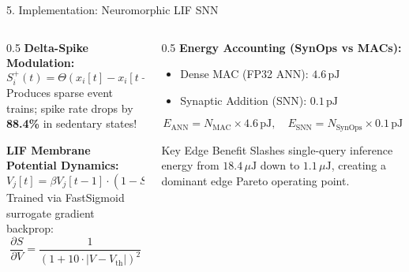 \documentclass[aspectratio=169]{beamer}
\begin{document}
\begin{frame}{5. Implementation: Neuromorphic LIF SNN}
\begin{columns}
\begin{column}{0.5\textwidth}
\textbf{Delta-Spike Modulation:}
\begin{equation*}
S_i^+(t) = \Theta(x_i[t] - x_i[t-1] - \delta)
\end{equation*}
Produces sparse event trains; spike rate drops by \textbf{88.4\%} in sedentary states!

\vspace{0.5em}
\textbf{LIF Membrane Potential Dynamics:}
\begin{equation*}
V_j[t] = \beta V_j[t-1] \cdot (1 - S_j^{\text{out}}[t-1]) + \sum W_{ij} S_i[t]
\end{equation*}
Trained via FastSigmoid surrogate gradient backprop:
\begin{equation*}
\frac{\partial S}{\partial V} = \frac{1}{(1 + 10 \cdot |V - V_{\text{th}}|)^2}
\end{equation*}
\end{column}
\begin{column}{0.5\textwidth}
\textbf{Energy Accounting (SynOps vs MACs):}
\begin{itemize}
    \item Dense MAC (FP32 ANN): \textbf{$4.6\,\text{pJ}$}
    \item Synaptic Addition (SNN): \textbf{$0.1\,\text{pJ}$}
\end{itemize}
\begin{equation*}
E_{\text{ANN}} = N_{\text{MAC}} \times 4.6\,\text{pJ}, \quad E_{\text{SNN}} = N_{\text{SynOps}} \times 0.1\,\text{pJ}
\end{equation*}
\vspace{0.5em}
\begin{alertblock}{Key Edge Benefit}
Slashes single-query inference energy from $18.4\,\mu\text{J}$ down to \textbf{$1.1\,\mu\text{J}$}, creating a dominant edge Pareto operating point.
\end{alertblock}
\end{column}
\end{columns}
\end{frame}
\end{document}
